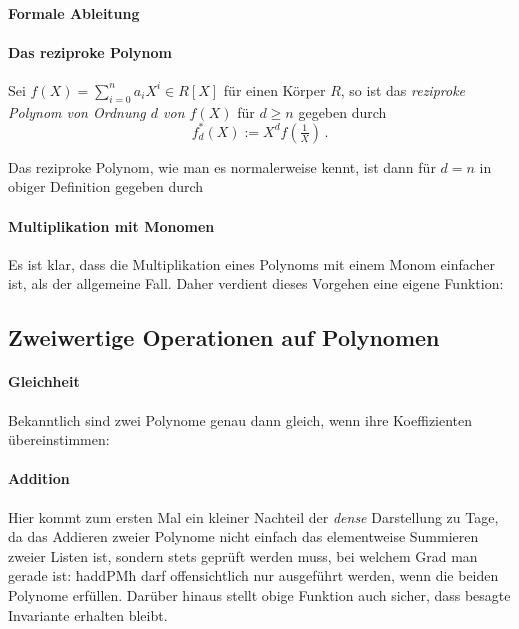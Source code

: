 \paragraph{Formale Ableitung} \makebox{ }

\paragraph{Das reziproke Polynom} 
\begin{definition}
  \label{def:reziprokesPoly}
  Sei $f(X) = \sum_{i=0}^n a_i X^i \in R[X]$ für einen Körper $R$, so ist 
  das \emph{reziproke Polynom von Ordnung $d$ von $f(X)$} für $d \geq n$ 
  gegeben durch
  \[ f^\ast_d(X) := X^d f(\tfrac{1}{X})\,.\]
\end{definition}


Das reziproke Polynom, wie man es normalerweise kennt, ist dann für $d=n$ in
obiger Definition gegeben durch



\paragraph{Multiplikation mit Monomen}
Es ist klar, dass die Multiplikation eines Polynoms mit einem Monom einfacher
ist, als der allgemeine Fall. Daher verdient dieses Vorgehen eine eigene
Funktion:





\subsection{Zweiwertige Operationen auf Polynomen}
\paragraph{Gleichheit} Bekanntlich sind zwei Polynome 
genau dann gleich, wenn ihre Koeffizienten übereinstimmen:


\paragraph{Addition} Hier kommt zum ersten Mal ein kleiner Nachteil der
\emph{dense} Darstellung zu Tage, da das Addieren zweier Polynome nicht einfach
das elementweise Summieren zweier Listen ist, sondern stets geprüft werden
muss, bei welchem Grad man gerade ist:
ħaddPMħ darf offensichtlich nur ausgeführt werden, wenn die beiden Polynome
 erfüllen. Darüber hinaus stellt obige Funktion auch sicher,
dass besagte Invariante erhalten bleibt.


